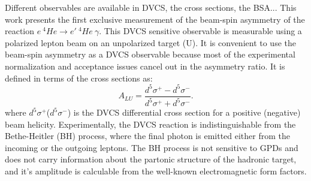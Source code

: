 \documentclass[nofootinbib,twocolumn,showpacs,prl,superscriptaddress,secnumarabic,amssymb,nobibnotes,aps,floatfix]{revtex4}
\begin{document}
Different observables are available in DVCS, the cross sections, the BSA...
This work presents the first exclusive measurement of the beam-spin asymmetry 
of the reaction $e~^{4}He\rightarrow e'~^{4}He~\gamma$. This DVCS sensitive 
observable is measurable using a polarized lepton beam on an unpolarized target 
(U). It is convenient to use the beam-spin asymmetry as a DVCS observable 
because most of the experimental normalization and acceptance issues cancel out 
in the asymmetry ratio. It is defined in terms of the cross sections as:
  \begin{equation}
  A_{LU} = \frac{d^{5}\sigma^{+} - d^{5}\sigma^{-} }
                {d^{5}\sigma^{+} + d^{5}\sigma^{-}}.
    \label{BSA_equation}
  \end{equation}
where $d^{5}\sigma^{+}$($d^{5}\sigma^{-}$) is the DVCS differential cross 
section for a positive (negative) beam helicity. Experimentally, the DVCS 
reaction is indistinguishable from the Bethe-Heitler (BH) process, where the 
final photon is emitted either from the incoming or the outgoing leptons. The 
BH process is not sensitive to GPDs and does not carry information about the 
partonic structure of the hadronic target, and it's amplitude is calculable 
from the well-known electromagnetic form factors.
\end{document}
